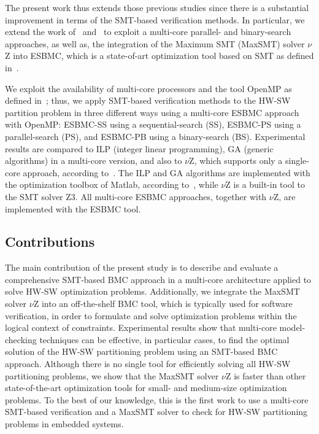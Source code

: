 \documentclass{doublecol-new}
\theoremstyle{TH}{
\newtheorem{lemma}{Lemma}
\newtheorem{theorem}[lemma]{Theorem}
\newtheorem{corrolary}[lemma]{Corrolary}
\newtheorem{conjecture}[lemma]{Conjecture}
\newtheorem{proposition}[lemma]{Proposition}
\newtheorem{claim}[lemma]{Claim}
\newtheorem{stheorem}[lemma]{Wrong Theorem}
\newtheorem{algorithm}{Algorithm}
}
\theoremstyle{THrm}{
\newtheorem{definition}{Definition}[section]
\newtheorem{question}{Question}[section]
\newtheorem{remark}{Remark}
\newtheorem{scheme}{Scheme}
}
\theoremstyle{THhit}{
\newtheorem{case}{Case}[section]
}
\begin{document}
The present work thus extends those previous studies since there is a substantial improvement in terms of the SMT-based verification methods. In particular, we extend the work of~\cite{Trindade2015} and~\cite{Trindade2016} to exploit a multi-core parallel- and binary-search approaches, as well as, the integration of the Maximum SMT (MaxSMT) solver $\nu$Z into ESBMC, which is a state-of-art optimization tool based on SMT as defined in~\cite{Bjorner2015}.

We exploit the availability of multi-core processors and the tool OpenMP as defined in~\cite{Tang2009}; thus, we apply SMT-based verification methods to the HW-SW partition problem in three different ways using a multi-core ESBMC approach with OpenMP: ESBMC-SS using a sequential-search (SS), ESBMC-PS using a parallel-search (PS), and ESBMC-PB using a binary-search (BS). Experimental results are compared to ILP (integer linear programming), GA (generic algorithms) in a multi-core version, and also to $\nu$Z, which supports only a single-core approach, according to~\cite{Bjorner2015}. The ILP and GA algorithms are implemented with the optimization toolbox of Matlab, according to~\cite{TheMathWorks2013}, while $\nu$Z is a built-in tool to the SMT solver Z3. All multi-core ESBMC approaches, together with $\nu$Z, are implemented with the ESBMC tool.

\subsection{Contributions} 

The main contribution of the present study is to describe and evaluate a comprehensive SMT-based BMC approach in a multi-core architecture applied to solve HW-SW optimization problems. Additionally, we integrate the MaxSMT solver $\nu$Z into an off-the-shelf BMC tool, which is typically used for software verification, in order to formulate and solve optimization problems within the logical context of constraints. Experimental results show that multi-core model-checking techniques can be effective, in particular cases, to find the optimal solution of the HW-SW partitioning problem using an SMT-based BMC approach. Although there is no single tool for efficiently solving all HW-SW partitioning problems, we show that the MaxSMT solver $\nu$Z is faster than other state-of-the-art optimization tools for small- and medium-size optimization problems.  To the best of our knowledge, this is the first work to use a multi-core SMT-based verification and a MaxSMT solver to check for HW-SW partitioning problems in embedded systems.
\end{document}
